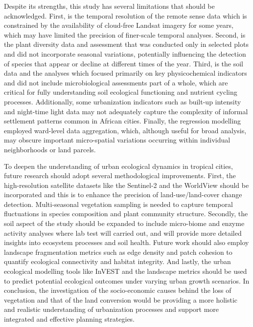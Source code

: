 Despite its strengths, this study has several limitations that should be acknowledged. First, is the temporal resolution of the remote sense data which is constrained by the availability of cloud-free Landsat imagery for some years, which may have limited the precision of finer-scale temporal analyses. Second, is the plant diversity data and assessment that was conducted only in selected plots and did not incorporate seasonal variations, potentially influencing the detection of species that appear or decline at different times of the year. Third, is the soil data and the analyses which focused primarily on key physicochemical indicators and did not include microbiological assessments part of a whole, which are critical for fully understanding soil ecological functioning and nutrient cycling processes. Additionally, some urbanization indicators such as built-up intensity and night-time light data may not adequately capture the complexity of informal settlement patterns common in African cities. Finally, the regression modelling employed ward-level data aggregation, which, although useful for broad analysis, may obscure important micro-spatial variations occurring within individual neighborhoods or land parcels.

To deepen the understanding of urban ecological dynamics in tropical cities, future research should adopt several methodological improvements. First, the high-resolution satellite datasets like the Sentinel-2 and the WorldView should be incorporated and this is to enhance the precision of land-use/land-cover change detection. Multi-seasonal vegetation sampling is needed to capture temporal fluctuations in species composition and plant community structure. Secondly, the soil aspect of the study should be expanded to include micro-biome and enzyme activity analyses where lab test will carried out, and will provide more detailed insights into ecosystem processes and soil health. Future work should also employ landscape fragmentation metrics such as edge density and patch cohesion to quantify ecological connectivity and habitat integrity. And lastly, the urban ecological modelling tools like InVEST and the landscape metrics should be used to predict potential ecological outcomes under varying urban growth scenarios. In conclusion, the investigation of the socio-economic causes behind the loss of vegetation and that of the land conversion would be providing a more holistic and realistic understanding of urbanization processes and support more integrated and effective planning strategies.

